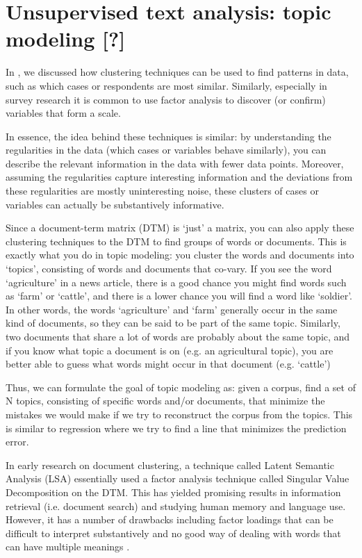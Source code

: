 \section{Unsupervised text analysis: topic modeling [?]}
\label{sec:unsupervised}

In , we discussed how clustering techniques can be used to find patterns in data,
such as which cases or respondents are most similar.
Similarly, especially in survey research it is common to use factor analysis to discover (or confirm) variables that form a scale.

In essence, the idea behind these techniques is similar:
by understanding the regularities in the data (which cases or variables behave similarly),
you can describe the relevant information in the data with fewer data points.
Moreover, assuming the regularities capture interesting information and the deviations from these regularities are mostly
uninteresting noise, these clusters of cases or variables can actually be substantively informative.

Since a document-term matrix (DTM) is `just' a matrix, you can also apply these clustering techniques to the DTM
to find groups of words or documents.
This is exactly what you do in topic modeling:
you cluster the words and documents into `topics', consisting of words and documents that co-vary.
If you see the word `agriculture' in a news article, there is a good chance you might find words such as `farm' or `cattle',
and there is a lower chance you will find a word like `soldier'.
In other words, the words `agriculture' and `farm' generally occur in the same kind of documents, so they can be said to be part of the same topic.
Similarly, two documents that share a lot of words are probably about the same topic,
and if you know what topic a document is on (e.g. an agricultural topic), you are better able to guess what words might occur in that document (e.g. `cattle')

Thus, we can formulate the goal of topic modeling as: given a corpus, find a set of N topics, consisting of specific words and/or documents, that minimize the mistakes we would make if we try to reconstruct the corpus from the topics.
This is similar to regression where we try to find a line that minimizes the prediction error.

In early research on document clustering, a technique called Latent Semantic Analysis (LSA) essentially used a factor analysis technique called Singular Value Decomposition on the DTM.
This has yielded promising results in information retrieval (i.e. document search) and studying human memory and language use.
However, it has a number of drawbacks including factor loadings that can be difficult to interpret substantively and no good way of dealing with words that can have multiple meanings \citep{lsa}.


